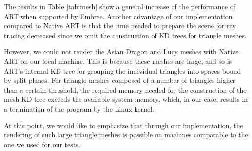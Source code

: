 The results in Table \ref{tab:mesh} show a general increase of the performance of ART when supported by Embree. Another advantage of our implementation compared to Native ART is that the time needed to prepare the scene for ray tracing decreased since we omit the construction of KD trees for triangle meshes.

However, we could not render the Asian Dragon and Lucy meshes with Native ART on our local machine. This is because these meshes are large, and so is ART's internal KD tree for grouping the individual triangles into spaces bound by split planes. For triangle meshes composed of a number of triangles higher than a certain threshold, the required memory needed for the construction of the mesh KD tree exceeds the available system memory, which, in our case, results in a termination of the program by the Linux kernel.

At this point, we would like to emphasize that through our implementation, the rendering of such large triangle meshes is possible on machines comparable to the one we used for our tests.
